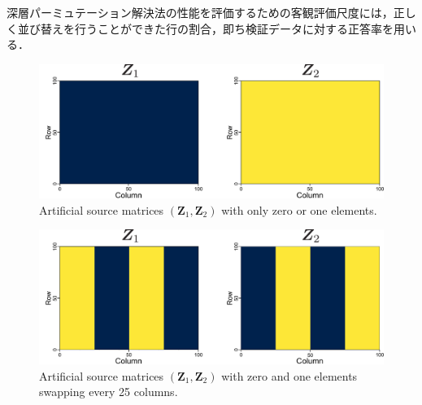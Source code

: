深層パーミュテーション解決法の性能を評価するための客観評価尺度には，正しく並び替えを行うことができた行の割合，即ち検証データに対する正答率を用いる．


\begin{figure}[t]
  \begin{center}
      \includegraphics[width=0.95\columnwidth]{figures/origi_spec/01mat.pdf}
  \end{center}
\caption{Artificial source matrices $(\bm{Z}_1, \bm{Z}_2)$ with only zero or one elements.}
\label{fig:01mat_spec}
\end{figure}

\begin{figure}[t]
  \begin{center}
      \includegraphics[width=0.95\columnwidth]{figures/origi_spec/25stripe.pdf}
  \end{center}
\caption{Artificial source matrices $(\bm{Z}_1, \bm{Z}_2)$ with zero and one elements swapping every 25 columns.}
\label{fig:25stripe_spec}
\end{figure}

